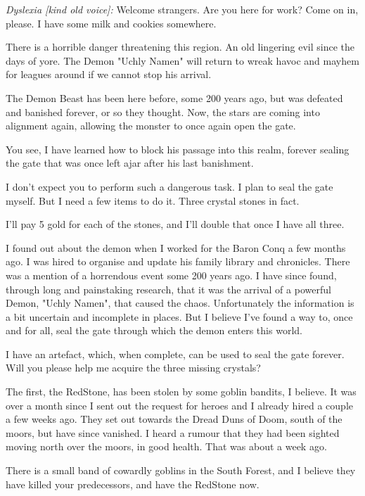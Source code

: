 \begin{readoutloud}
\emph{Dyslexia [kind old voice]:} Welcome strangers. Are you here for work? Come on in, please. I have some milk and cookies somewhere.

There is a horrible danger threatening this region. An old lingering evil since the days of yore. The Demon "Uchly Namen" will return to wreak havoc and mayhem for leagues around if we cannot stop his arrival.

The Demon Beast has been here before, some 200 years ago, but was defeated and banished forever, or so they thought. Now, the stars are coming into alignment again, allowing the monster to once again open the gate.

You see, I have learned how to block his passage into this realm, forever sealing the gate that was once left ajar after his last banishment.

I don't expect you to perform such a dangerous task. I plan to seal the gate myself. But I need a few items to do it. Three crystal stones in fact.

I'll pay 5 gold for each of the stones, and I'll double that once I have all three.

I found out about the demon when I worked for the Baron Conq a few months ago. I was hired to organise and update his family library and chronicles. There was a mention of a horrendous event some 200 years ago. I have since found, through long and painstaking research, that it was the arrival of a powerful Demon, "Uchly Namen", that caused the chaos. Unfortunately the information is a bit uncertain and incomplete in places. But I believe I've found a way to, once and for all, seal the gate through which the demon enters this world.

I have an artefact, which, when complete, can be used to seal the gate forever. Will you please help me acquire the three missing crystals?

The first, the RedStone, has been stolen by some goblin bandits, I believe.
It was over a month since I sent out the request for heroes and I already hired a couple a few weeks ago. They set out towards the Dread Duns of Doom, south of the moors, but have since vanished. I heard a rumour that they had been sighted moving north over the moors, in good health. That was about a week ago.

There is a small band of cowardly goblins in the South Forest, and I believe they have killed your predecessors, and have the RedStone now.


\end{readoutloud}
